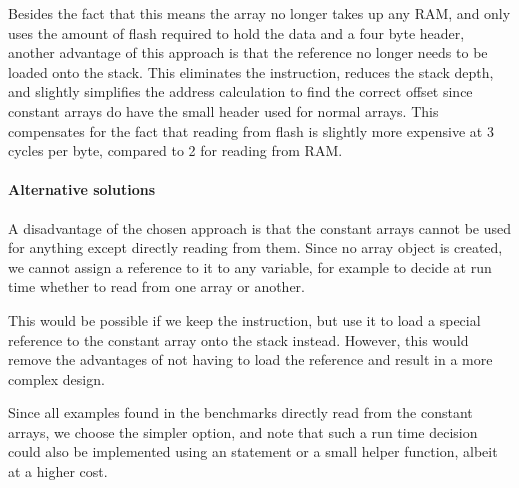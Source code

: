 Besides the fact that this means the array no longer takes up any RAM, and only uses the amount of flash required to hold the data and a four byte header, another advantage of this approach is that the reference no longer needs to be loaded onto the stack. This eliminates the  instruction, reduces the stack depth, and slightly simplifies the address calculation to find the correct offset since constant arrays do have the small header used for normal arrays. This compensates for the fact that reading from flash is slightly more expensive at 3 cycles per byte, compared to 2 for reading from RAM. 

\paragraph{Alternative solutions}
A disadvantage of the chosen approach is that the constant arrays cannot be used for anything except directly reading from them. Since no array object is created, we cannot assign a reference to it to any variable, for example to decide at run time whether to read from one array or another.

This would be possible if we keep the  instruction, but use it to load a special reference to the constant array onto the stack instead. However, this would remove the advantages of not having to load the reference and result in a more complex design.

Since all examples found in the benchmarks directly read from the constant arrays, we choose the simpler option, and note that such a run time decision could also be implemented using an  statement or a small helper function, albeit at a higher cost. 
